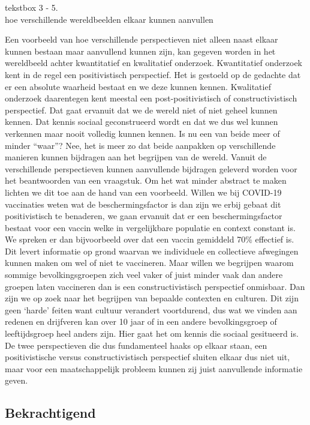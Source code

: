 \documentclass[smallauthor, chapterhaspagenum, nochapterinheader, pagenuminheader,  bigchapnum,medium2, tocpages, garamond, titleinheader]{jote-book}
\begin{document}
	\begin{bookbox}{\raggedright tekstbox 3 - 5. \\hoe verschillende wereldbeelden elkaar kunnen aanvullen}
		Een voorbeeld van hoe verschillende perspectieven niet alleen naast elkaar kunnen bestaan maar aanvullend kunnen zijn, kan gegeven worden in het wereldbeeld achter kwantitatief en kwalitatief onderzoek. Kwantitatief onderzoek kent in de regel een positivistisch perspectief. Het is gestoeld op de gedachte dat er een absolute waarheid bestaat en we deze kunnen kennen. Kwalitatief onderzoek daarentegen kent meestal een post-positivistisch of constructivistisch perspectief. Dat gaat ervanuit dat we de wereld niet of niet geheel kunnen kennen. Dat kennis sociaal geconstrueerd wordt en dat we dus wel kunnen verkennen maar nooit volledig kunnen kennen. Is nu een van beide meer of minder “waar”? Nee, het is meer zo dat beide aanpakken op verschillende manieren kunnen bijdragen aan het begrijpen van de wereld. Vanuit de verschillende perspectieven kunnen aanvullende bijdragen geleverd worden voor het beantwoorden van een vraagstuk. Om het wat minder abstract te maken lichten we dit toe aan de hand van een voorbeeld. Willen we bij COVID-19 vaccinaties weten wat de beschermingsfactor is dan zijn we erbij gebaat dit positivistisch te benaderen, we gaan ervanuit dat er een beschermingsfactor bestaat voor een vaccin welke in vergelijkbare populatie en context constant is. We spreken er dan bijvoorbeeld over dat een vaccin gemiddeld 70\% effectief is. Dit levert informatie op grond waarvan we individuele en collectieve afwegingen kunnen maken om wel of niet te vaccineren. Maar willen we begrijpen waarom sommige bevolkingsgroepen zich veel vaker of juist minder vaak dan andere groepen laten vaccineren dan is een constructivistisch perspectief onmisbaar. Dan zijn we op zoek naar het begrijpen van bepaalde contexten en culturen. Dit zijn geen ‘harde' feiten want cultuur verandert voortdurend, dus wat we vinden aan redenen en drijfveren kan over 10 jaar of in een andere bevolkingsgroep of leeftijdsgroep heel anders zijn. Hier gaat het om kennis die sociaal gesitueerd is. De twee perspectieven die dus fundamenteel haaks op elkaar staan, een positivistische versus constructivistisch perspectief sluiten elkaar dus niet uit, maar voor een maatschappelijk probleem kunnen zij juist aanvullende informatie geven.
	\end{bookbox}

	\subsection{Bekrachtigend}
\end{document}
